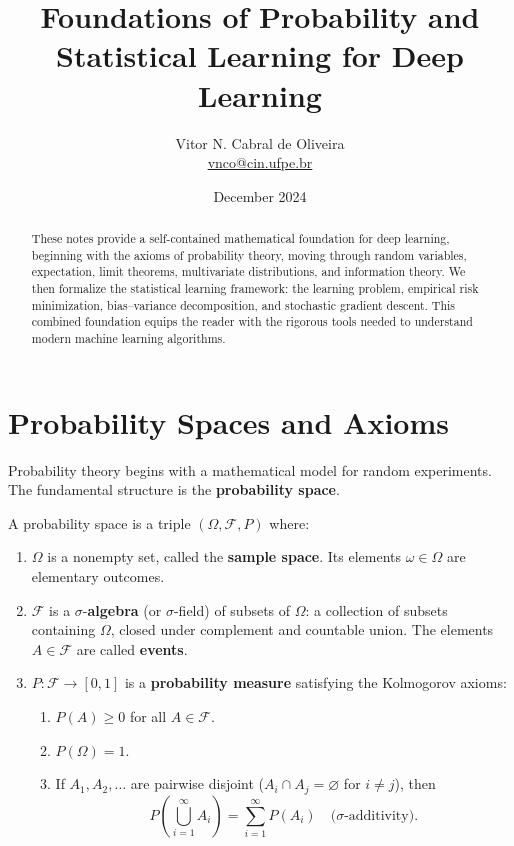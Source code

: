 \documentclass{tufte-handout}
\title{Foundations of Probability and Statistical Learning for Deep Learning}
\author{Vitor N. Cabral de Oliveira\\ \href{mailto:vnco@cin.ufpe.br}{vnco@cin.ufpe.br}}
\date{December 2024}
\begin{document}
\maketitle

\begin{abstract}
    These notes provide a self-contained mathematical foundation for deep learning, beginning with the axioms of probability theory, moving through random variables, expectation, limit theorems, multivariate distributions, and information theory. We then formalize the statistical learning framework: the learning problem, empirical risk minimization, bias–variance decomposition, and stochastic gradient descent. This combined foundation equips the reader with the rigorous tools needed to understand modern machine learning algorithms.
\end{abstract}

\newpage
\hypersetup{linkcolor=wp-text}
\tableofcontents
\hypersetup{linkcolor=wp-primary}
\newpage

\section{Probability Spaces and Axioms}

Probability theory begins with a mathematical model for random experiments. The fundamental structure is the \textbf{probability space}.

\begin{defn}
    A probability space is a triple $(\Omega, \mathcal{F}, P)$ where:
    \begin{enumerate}[label=(\roman*)]
        \item $\Omega$ is a nonempty set, called the \textbf{sample space}. Its elements $\omega \in \Omega$ are elementary outcomes.
        \item $\mathcal{F}$ is a $\sigma$-\textbf{algebra} (or $\sigma$-field) of subsets of $\Omega$: a collection of subsets containing $\Omega$, closed under complement and countable union. The elements $A \in \mathcal{F}$ are called \textbf{events}.
        \item $P: \mathcal{F} \to [0,1]$ is a \textbf{probability measure} satisfying the Kolmogorov axioms:
            \begin{enumerate}
                \item $P(A) \ge 0$ for all $A \in \mathcal{F}$.
                \item $P(\Omega) = 1$.
                \item If $A_1, A_2, \dots$ are pairwise disjoint ($A_i \cap A_j = \varnothing$ for $i \ne j$), then
                \[
                P\!\left(\bigcup_{i=1}^{\infty} A_i\right) = \sum_{i=1}^{\infty} P(A_i) \quad \text{($\sigma$-additivity)}.
                \]
            \end{enumerate}
    \end{enumerate}
\end{defn}
\end{document}
